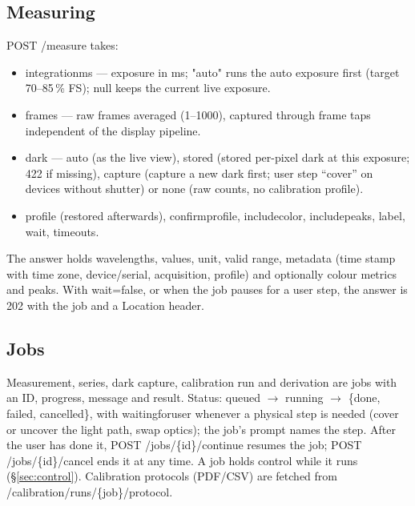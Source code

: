 \documentclass[12pt,a4paper]{article}
\DeclareRobustCommand{\code}[1]{{\ttfamily\small\def\_{\rawus\allowbreak}#1}}
\begin{document}
\subsection{Measuring}
\code{POST /measure} takes:
\begin{itemize}
  \item \code{integration\_ms} --- exposure in ms; \code{"auto"} runs the auto exposure
        first (target 70--85\,\% FS); \code{null} keeps the current live exposure.
  \item \code{frames} --- raw frames averaged (1--1000), captured through frame
        taps independent of the display pipeline.
  \item \code{dark} --- \code{auto} (as the live view), \code{stored} (stored
        per-pixel dark at this exposure; 422 if missing), \code{capture} (capture a
        new dark first; user step ``cover'' on devices without shutter) or
        \code{none} (raw counts, no calibration profile).
  \item \code{profile} (restored afterwards), \code{confirm\_profile},
        \code{include\_color}, \code{include\_peaks}, \code{label}, \code{wait},
        \code{timeout\_s}.
\end{itemize}
The answer holds wavelengths, values, unit, valid range, metadata (time stamp with
time zone, device\slash serial, acquisition, profile) and optionally colour
metrics and peaks. With \code{wait=false}, or when the job pauses for a user step,
the answer is \code{202} with the job and a \code{Location} header.

\subsection{Jobs}
Measurement, series, dark capture, calibration run and derivation are jobs with an
ID, progress, message and result. Status:
\code{queued} $\to$ \code{running} $\to$ \{\code{done}, \code{failed},
\code{cancelled}\}, with \code{waiting\_for\_user} whenever a physical step is
needed (cover or uncover the light path, swap optics); the job's \code{prompt}
names the step. After the user has done it, \code{POST /jobs/\{id\}/continue}
resumes the job; \code{POST /jobs/\{id\}/cancel} ends it at any time. A job holds
control while it runs (\S\ref{sec:control}). Calibration protocols (PDF\slash CSV) are
fetched from \code{/calibration/runs/\{job\}/protocol}.
\end{document}
